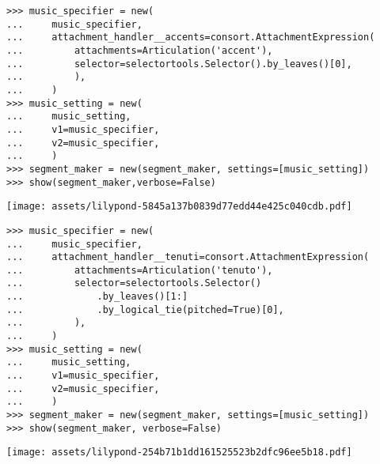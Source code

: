 \begin{abjadbookoutput}
\begin{singlespacing}
\vspace{-0.5\baselineskip}
\begin{lstlisting}
>>> music_specifier = new(
...     music_specifier,
...     attachment_handler__accents=consort.AttachmentExpression(
...         attachments=Articulation('accent'),
...         selector=selectortools.Selector().by_leaves()[0],
...         ),
...     )
>>> music_setting = new(
...     music_setting,
...     v1=music_specifier,
...     v2=music_specifier,
...     )
>>> segment_maker = new(segment_maker, settings=[music_setting])
>>> show(segment_maker,verbose=False)
\end{lstlisting}
\noindent\texttt{[image: assets/lilypond-5845a137b0839d77edd44e425c040cdb.pdf]}
\end{singlespacing}
\end{abjadbookoutput}

\begin{comment}
<abjad>[stylesheet=../consort.ily]
music_specifier = new(
    music_specifier,
    attachment_handler__tenuti=consort.AttachmentExpression(
        attachments=Articulation('tenuto'),
        selector=selectortools.Selector()
            .by_leaves()[1:]
            .by_logical_tie(pitched=True)[0],
        ),
    )
music_setting = new(
    music_setting,
    v1=music_specifier,
    v2=music_specifier,
    )
segment_maker = new(segment_maker, settings=[music_setting])
show(segment_maker, verbose=False)
</abjad>
\end{comment}

\begin{abjadbookoutput}
\begin{singlespacing}
\vspace{-0.5\baselineskip}
\begin{lstlisting}
>>> music_specifier = new(
...     music_specifier,
...     attachment_handler__tenuti=consort.AttachmentExpression(
...         attachments=Articulation('tenuto'),
...         selector=selectortools.Selector()
...             .by_leaves()[1:]
...             .by_logical_tie(pitched=True)[0],
...         ),
...     )
>>> music_setting = new(
...     music_setting,
...     v1=music_specifier,
...     v2=music_specifier,
...     )
>>> segment_maker = new(segment_maker, settings=[music_setting])
>>> show(segment_maker, verbose=False)
\end{lstlisting}
\noindent\texttt{[image: assets/lilypond-254b71b1dd161525523b2dfc96ee5b18.pdf]}
\end{singlespacing}
\end{abjadbookoutput}


